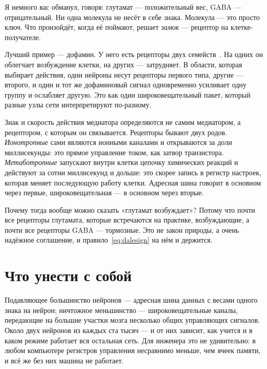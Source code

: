 Я немного вас обманул, говоря: глутамат --- положительный вес, GABA --- отрицательный. Ни одна молекула не несёт в себе знака. Молекула --- это просто ключ. Что произойдёт, когда её поймают, решает \emph{замок} --- рецептор на клетке-получателе.

Лучший пример --- дофамин. У него есть рецепторы двух семейств~\cite{Beaulieu2011}. На одних он облегчает возбуждение клетки, на других --- затрудняет. В области, которая выбирает действия, одни нейроны несут рецепторы первого типа, другие --- второго, и один и тот же дофаминовый сигнал одновременно усиливает одну группу и ослабляет другую. Это как один широковещательный пакет, который разные узлы сети интерпретируют по-разному.

\begin{keyblock}
\begin{proposition}
\label{prop:receptor}
Знак и скорость действия медиатора определяются не самим медиатором, а рецептором, с которым он связывается. Рецепторы бывают двух родов. \emph{Ионотропные} сами являются ионными каналами и открываются за доли миллисекунды: это прямое управление током, как затвор транзистора. \emph{Метаботропные} запускают внутри клетки цепочку химических реакций и действуют за сотни миллисекунд и дольше: это скорее запись в регистр настроек, которая меняет последующую работу клетки. Адресная шина говорит в основном через первые, широковещательная --- в основном через вторые.
\end{proposition}
\end{keyblock}

Почему тогда вообще можно сказать «глутамат возбуждает»? Потому что почти все рецепторы глутамата, которые встречаются на практике, возбуждающие, а почти все рецепторы GABA --- тормозные. Это не закон природы, а очень надёжное соглашение, и правило~\eqref{eq:dalesign} на нём и держится.

\section{Что унести с собой}

Подавляющее большинство нейронов --- адресная шина данных с весами одного знака на нейрон; ничтожное меньшинство --- широковещательные каналы, передающие на большие участки мозга несколько общих управляющих сигналов. Около двух нейронов из каждых ста тысяч --- и от них зависит, как учится и в каком режиме работает вся остальная сеть. Для инженера это не удивительно: в любом компьютере регистров управления несравнимо меньше, чем ячеек памяти, и всё же без них машина не работает.


